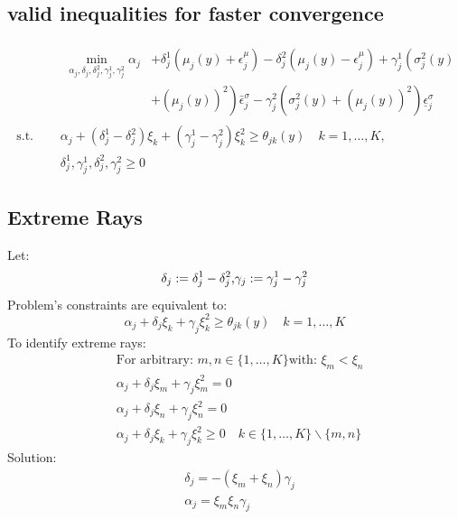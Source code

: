 \documentclass{beamer}
\begin{document}
	\subsection{valid inequalities for faster convergence}
	\begin{frame}
		\begin{equation}
			\begin{aligned}
			&\begin{aligned}
			\min _{\alpha_j, \delta_j, \delta_j^2, \gamma_j^1, \gamma_j^2} \alpha_j & +\delta_j^1\left(\mu_j(y)+\epsilon_j^\mu\right)-\delta_j^2\left(\mu_j(y)-\epsilon_j^\mu\right)+\gamma_j^1\left(\sigma_j^2(y)\right. \\
			& \left.+\left(\mu_j(y)\right)^2\right) \bar{\epsilon}_j^\sigma-\gamma_j^2\left(\sigma_j^2(y)+\left(\mu_j(y)\right)^2\right) \underline{\epsilon}_j^\sigma
			\end{aligned}\\
			\text { s.t. } \quad &\alpha_j+\left(\delta_j^1-\delta_j^2\right) \xi_k+\left(\gamma_j^1-\gamma_j^2\right) \xi_k^2 \geq \theta_{j k}(y) \quad k=1, \ldots, K \text {, }\\
			&\delta_j^1, \gamma_j^1, \delta_j^2, \gamma_j^2 \geq 0
			\end{aligned}
			\end{equation}
	\end{frame}

	\subsection{Extreme Rays}
	\begin{frame} Let:
		\begin{equation}
			\delta_j:=\delta_j^1-\delta_j^2 \text, \gamma_j:=\gamma_j^1-\gamma_j^2
			\end{equation}
			Problem's constraints are equivalent to:
			\begin{equation}
				\alpha_j+\delta_j \xi_k+\gamma_j \xi_k^2 \geq \theta_{j k}(y) \quad k=1, \ldots, K
				\end{equation}
			To identify extreme rays:
				\begin{equation}
					\begin{aligned}
					& \text{For arbitrary: } m, n \in\{1, \ldots, K\} \text{with: } \xi_m<\xi_n\\
					& \alpha_j+\delta_j \xi_m+\gamma_j \xi_m^2=0 \\
					& \alpha_j+\delta_j \xi_n+\gamma_j \xi_n^2=0 \\
					& \alpha_j+\delta_j \xi_k+\gamma_j \xi_k^2 \geq 0 \quad k \in\{1, \ldots, K\} \backslash\{m, n\}
					\end{aligned}
				\end{equation}
				Solution:
				\begin{equation}
					\begin{aligned}
					& \delta_j= -(\xi_m+\xi_n)\gamma_j \\
					& \alpha_j=\xi_m\xi_n\gamma_j\\
					\end{aligned}
				\end{equation}
		\end{frame}	
\end{document}
